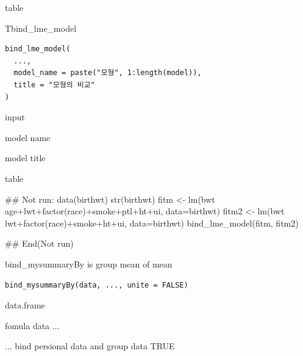 \documentclass[a4paper]{book}
\begin{document}
%
\begin{Value}
table
\end{Value}
%
\begin{Description}
Tbind\_lme\_model
\end{Description}
%
\begin{Usage}
\begin{verbatim}
bind_lme_model(
  ...,
  model_name = paste("모형", 1:length(model)),
  title = "모형의 비교"
)
\end{verbatim}
\end{Usage}
%
\begin{Arguments}
\begin{ldescription}
\item[\code{...}] input

\item[\code{model\_name}] model name

\item[\code{title}] model title
\end{ldescription}
\end{Arguments}
%
\begin{Value}
table
\end{Value}
%
\begin{Examples}
\begin{ExampleCode}
## Not run: 
data(birthwt)
str(birthwt)
fitm <- lm(bwt ~ age+lwt+factor(race)+smoke+ptl+ht+ui, data=birthwt)
fitm2 <- lm(bwt ~ lwt+factor(race)+smoke+ht+ui, data=birthwt)
bind_lme_model(fitm, fitm2)


## End(Not run)
\end{ExampleCode}
\end{Examples}
%
\begin{Description}
bind\_mysummaryBy is group mean of mean
\end{Description}
%
\begin{Usage}
\begin{verbatim}
bind_mysummaryBy(data, ..., unite = FALSE)
\end{verbatim}
\end{Usage}
%
\begin{Arguments}
\begin{ldescription}
\item[\code{data}] data.frame

\item[\code{...}] fomula data ...

\item[\code{unite}] ... bind persional data and group data  TRUE
\end{ldescription}
\end{Arguments}
\end{document}
